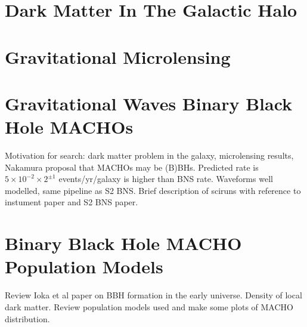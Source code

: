 
\section{Dark Matter In The Galactic Halo}

\section{Gravitational Microlensing}

\section{Gravitational Waves Binary Black Hole MACHOs}

Motivation for search: dark matter problem in the galaxy, microlensing
results, Nakamura proposal that MACHOs may be (B)BHs. Predicted rate is
$5\times10^{-2}\times2^{\pm 1}$ events/yr/galaxy is higher than BNS rate.
Waveforms well modelled, same pipeline as S2 BNS. Brief description of sciruns
with reference to instument paper and S2 BNS paper.

\section{Binary Black Hole MACHO Population Models}

Review Ioka et al paper on BBH formation in the early universe. Density of
local dark matter. Review population models used and make some plots of MACHO
distribution.

